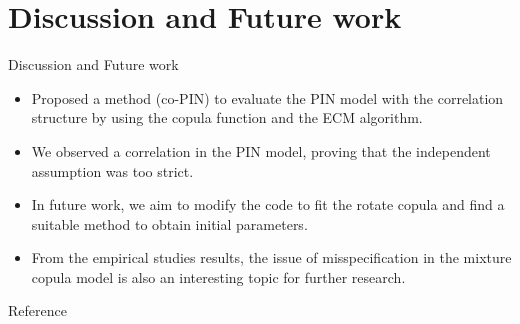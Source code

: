 \documentclass{beamer}
\begin{document}
\section{Discussion and Future work}

\begin{frame}{Discussion and Future work}
    \begin{itemize}
        \item Proposed a method (co-PIN) to evaluate the PIN model with the correlation structure by using the copula function and the ECM algorithm.
        
        \item We observed a correlation in the PIN model, proving that the independent assumption was too strict.
        
        \item In future work, we aim to modify the code to fit the rotate copula and find a suitable method to obtain initial parameters. 
        
        \item From the empirical studies results, the issue of misspecification in the mixture copula model is also an interesting topic for further research.
    \end{itemize}
\end{frame}


\begin{frame}[allowframebreaks]{Reference}
    \nocite{*}
    \AtNextBibliography{\scriptsize}
    \printbibliography
\end{frame}


\end{document}
